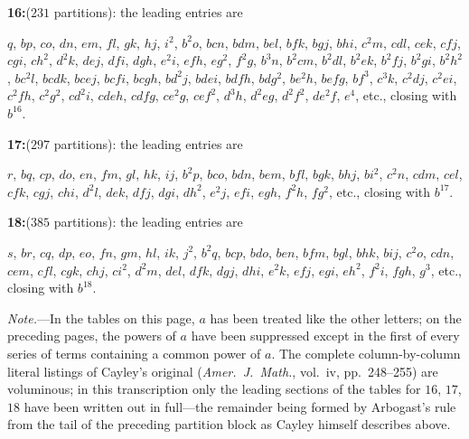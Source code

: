 \documentclass[11pt,a4paper]{article}
\begin{document}
\newpage
{\sloppy
\noindent\textbf{16:}\quad ($231$ partitions): the leading entries are\par\noindent
$q$, $bp$, $co$, $dn$, $em$, $fl$, $gk$, $hj$, $i^{2}$, $b^{2}o$, $bcn$, $bdm$, $bel$, $bfk$, $bgj$, $bhi$, $c^{2}m$, $cdl$, $cek$, $cfj$, $cgi$, $ch^{2}$, $d^{2}k$, $dej$, $dfi$, $dgh$, $e^{2}i$, $efh$, $eg^{2}$, $f^{2}g$, $b^{3}n$, $b^{2}cm$, $b^{2}dl$, $b^{2}ek$, $b^{2}fj$, $b^{2}gi$, $b^{2}h^{2}$, $bc^{2}l$, $bcdk$, $bcej$, $bcfi$, $bcgh$, $bd^{2}j$, $bdei$, $bdfh$, $bdg^{2}$, $be^{2}h$, $befg$, $bf^{3}$, $c^{3}k$, $c^{2}dj$, $c^{2}ei$, $c^{2}fh$, $c^{2}g^{2}$, $cd^{2}i$, $cdeh$, $cdfg$, $ce^{2}g$, $cef^{2}$, $d^{3}h$, $d^{2}eg$, $d^{2}f^{2}$, $de^{2}f$, $e^{4}$, etc., closing with $b^{16}$.

\smallskip
\noindent\textbf{17:}\quad ($297$ partitions): the leading entries are\par\noindent
$r$, $bq$, $cp$, $do$, $en$, $fm$, $gl$, $hk$, $ij$, $b^{2}p$, $bco$, $bdn$, $bem$, $bfl$, $bgk$, $bhj$, $bi^{2}$, $c^{2}n$, $cdm$, $cel$, $cfk$, $cgj$, $chi$, $d^{2}l$, $dek$, $dfj$, $dgi$, $dh^{2}$, $e^{2}j$, $efi$, $egh$, $f^{2}h$, $fg^{2}$, etc., closing with $b^{17}$.

\smallskip
\noindent\textbf{18:}\quad ($385$ partitions): the leading entries are\par\noindent
$s$, $br$, $cq$, $dp$, $eo$, $fn$, $gm$, $hl$, $ik$, $j^{2}$, $b^{2}q$, $bcp$, $bdo$, $ben$, $bfm$, $bgl$, $bhk$, $bij$, $c^{2}o$, $cdn$, $cem$, $cfl$, $cgk$, $chj$, $ci^{2}$, $d^{2}m$, $del$, $dfk$, $dgj$, $dhi$, $e^{2}k$, $efj$, $egi$, $eh^{2}$, $f^{2}i$, $fgh$, $g^{3}$, etc., closing with $b^{18}$.
\par}

\medskip

\noindent\textit{Note.}---In the tables on this page, $a$ has been
treated like the other letters; on the preceding pages, the powers of
$a$ have been suppressed except in the first of every series of terms
containing a common power of $a$. The complete column-by-column literal
listings of Cayley's original (\textit{Amer.\ J.\ Math.}, vol.\ iv,
pp.\ 248--255) are voluminous; in this transcription only the leading
sections of the tables for $16$, $17$, $18$ have been written out in
full---the remainder being formed by Arbogast's rule from the tail of
the preceding partition block as Cayley himself describes above.

\bigskip

\end{document}
